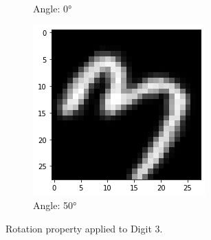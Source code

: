 \begin{figure}[!htbp]
\begin{subfigure}[b]{.3\textwidth}
            \caption{Angle: \ang{0}}
            \label{fig:Rotate-misclass0}
        \end{subfigure}%
        \begin{subfigure}[b]{.3\textwidth}
            \centering
            \includegraphics[width=\linewidth]{images/rotate3.png}
            \caption{Angle: \ang{50}}
            \label{fig:Rotate-misclass0}
        \end{subfigure}
        \caption{Rotation property applied to Digit 3.}
        \label{fig:Rotate-misclassifications}
    \end{figure}
    \FloatBarrier

